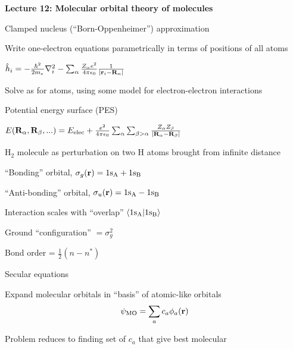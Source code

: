 \documentclass[11pt]{article}
\begin{document}
\begin{outline}
 \item {\bf Lecture 12: Molecular orbital theory of molecules}
   \begin{outline}
   \item Clamped nucleus (``Born-Oppenheimer'') approximation
     \begin{outline}
     \item Write one-electron equations parametrically in terms of positions of
     all atoms
   \item   $\hat h_i = -\frac{\hbar^2}{2m_e}\nabla^2_i-\sum_\alpha \frac{Z_\alpha
         e^2}{4\pi\epsilon_0}\frac{1}{|{\bf r}_i-{\bf R}_\alpha|}$
     \item Solve as for atoms, using some model for electron-electron interactions
     \item Potential energy surface (PES)
       \begin{outline}
       \item $E({\bf R}_\alpha, {\bf
           R}_\beta,...)=E_\mathrm{elec}+\frac{e^2}{4\pi\epsilon_0}\sum_\alpha\sum_{\beta>\alpha}\frac{Z_\alpha
           Z_\beta}{|{\bf R}_\alpha-{\bf R}_\beta|}$ 
       \end{outline}
     \end{outline}
   \item H$_2$ molecule as perturbation on two H atoms brought from infinite distance
     \begin{outline}
       \item ``Bonding'' orbital, $\sigma_g({\bf r}) = 1{\rm s_A}+1{\rm s_B}$
       \item ``Anti-bonding'' orbital, $\sigma_u({\bf r}) = 1{\rm s_A}-1{\rm s_B}$
       \item Interaction scales with ``overlap'' $\langle 1{\rm s_A} | 1{\rm
           s_B} \rangle$
       \item Ground ``configuration'' $=\sigma_g^2$
       \item Bond order = $\frac{1}{2}(n-n^*)$
     \end{outline}
   \item Secular equations
     \begin{outline}
     \item Expand molecular orbitals in ``basis'' of atomic-like orbitals
       \begin{equation}
         \psi_\mathrm{MO}=\sum_a c_a\phi_a({\bf r})
       \end{equation}
     \item Problem reduces to finding set of $c_a$ that give best molecular

\end{outline}
\end{outline}
\end{outline}
\end{document}
